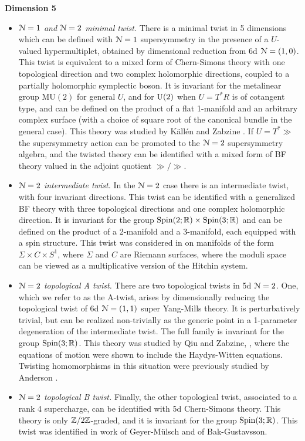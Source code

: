 \documentclass[10pt, oneside]{article}
\newcommand{\MU}{\mathrm{MU}}
\begin{document}
\textbf{Dimension 5}
\begin{itemize}
 \item \emph{$\mathcal{N}=1$ and $\mathcal{N}=2$ minimal twist.}  There is a minimal twist in 5 dimensions which can be defined with $\mathcal{N}=1$ supersymmetry in the presence of a $U$-valued hypermultiplet, obtained by dimensional reduction from 6d $\mathcal{N}=(1,0)$.  This twist is equivalent to a mixed form of Chern-Simons theory with one topological direction and two complex holomorphic directions, coupled to a partially holomorphic symplectic boson.  It is invariant for the metalinear group $\MU(2)$ for general $U$, and for $\mathrm{U}(2)$ when $U = T^*R$ is of cotangent type, and can be defined on the product of a flat 1-manifold and an arbitrary complex surface (with a choice of square root of the canonical bundle in the general case).  This theory was studied by K\"all\'en and Zabzine  \cite{KallenZabzine}.  If $U = T^*\gg$ the supersymmetry action can be promoted to the $\mathcal{N}=2$ supersymmetry algebra, and the twisted theory can be identified with a mixed form of BF theory valued in the adjoint quotient $\gg/\gg$.
 \item \emph{$\mathcal{N}=2$ intermediate twist.} In the $\mathcal{N}=2$ case there is an intermediate twist, with four invariant directions.  This twist can be identified with a generalized BF theory with three topological directions and one complex holomorphic direction.  It is invariant for the group $\mathrm{Spin}(2;\mathbb R) \times \mathrm{Spin}(3;\mathbb R)$ and can be defined on the product of a 2-manifold and a 3-manifold, each equipped with a spin structure.  This twist was considered in \cite{ElliottPestun} on manifolds of the form $\Sigma \times C \times S^1$, where $\Sigma$ and $C$ are Riemann surfaces, where the moduli space can be viewed as a multiplicative version of the Hitchin system.
 \item \emph{$\mathcal{N}=2$ topological A twist.} There are two topological twists in 5d $\mathcal{N}=2$.  One, which we refer to as the A-twist, arises by dimensionally reducing the topological twist of 6d $\mathcal{N}=(1,1)$ super Yang-Mills theory.  It is perturbatively trivial, but can be realized non-trivially as the generic point in a 1-parameter degeneration of the intermediate twist.  The full family is invariant for the group $\mathrm{Spin}(3;\mathbb R)$.  This theory was studied by Qiu and Zabzine, \cite{QiuZabzine}, where the equations of motion were shown to include the Haydys-Witten equations.  Twisting homomorphisms in this situation were previously studied by Anderson \cite{Anderson}.
 \item \emph{$\mathcal{N}=2$ topological B twist.} Finally, the other topological twist, associated to a rank 4 supercharge, can be identified with 5d Chern-Simons theory.  This theory is only $\mathbb Z/2\mathbb Z$-graded, and it is invariant for the group $\mathrm{Spin}(3;\mathbb R)$.  This twist was identified in work of Geyer-M\"ulsch and of Bak-Gustavsson\cite{GeyerMuelsch, BakGustavsson1,BakGustavsson2}.
\end{itemize}
\end{document}
